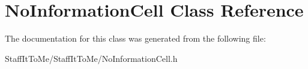 \hypertarget{interface_no_information_cell}{
\section{\-No\-Information\-Cell \-Class \-Reference}
\label{interface_no_information_cell}
}


\-The documentation for this class was generated from the following file\-:\begin{DoxyCompactItemize}
\item 
\-Staff\-It\-To\-Me/\-Staff\-It\-To\-Me/\-No\-Information\-Cell.\-h\end{DoxyCompactItemize}
